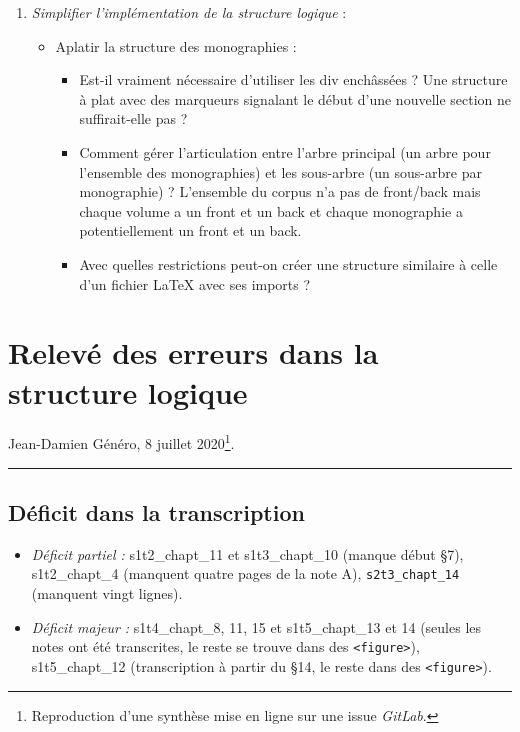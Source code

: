 \begin{enumerate}
    \item \textit{Simplifier l'implémentation de la structure logique} :
    \begin{itemize}
        \item Aplatir la structure des monographies :
        \begin{itemize}
            \item  Est-il vraiment nécessaire d'utiliser les div enchâssées ? Une structure à plat avec des marqueurs signalant le début d'une nouvelle section ne suffirait-elle pas ?
            \item  Comment gérer l'articulation entre l'arbre principal (un arbre pour l'ensemble des monographies) et les sous-arbre (un sous-arbre par monographie) ? L'ensemble du corpus n'a pas de front/back mais chaque volume a un front et un back et chaque monographie a potentiellement un front et un back.
            \item  Avec quelles restrictions peut-on créer une structure similaire à celle d'un fichier \LaTeX{} avec ses imports ?
        \end{itemize}
    \end{itemize}
\end{enumerate}

\section{Relevé des erreurs dans la structure
logique}\label{ann:releve_erreurs}

Jean-Damien Généro, 8 juillet 2020\footnote{Reproduction d'une synthèse mise en ligne sur une issue \textit{GitLab}.}.

\begin{center}\rule{3in}{0.4pt}\end{center}

\subsection{Déficit dans la
transcription}\label{ann:deficit-transcr}

\begin{itemize}
\item
  \emph{Déficit partiel :} s1t2\_chapt\_11 et s1t3\_chapt\_10 (manque
  début §7), s1t2\_chapt\_4 (manquent quatre pages de la note A), \texttt{s2t3\_chapt\_14} (manquent vingt lignes).
\item
  \emph{Déficit majeur :} s1t4\_chapt\_8, 11, 15 et s1t5\_chapt\_13 et
  14 (seules les notes ont été transcrites, le reste se trouve dans des
  \texttt{\textless{}figure\textgreater{}}), s1t5\_chapt\_12
  (transcription à partir du §14, le reste dans des
  \texttt{\textless{}figure\textgreater{}}).
\end{itemize}

